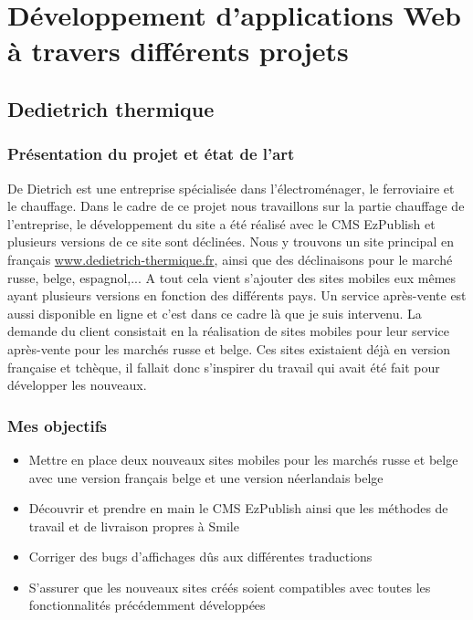 \documentclass[a4paper,11pt,twoside]{report}
\begin{document}
\chapter{Développement d'applications Web à travers différents projets}
  \section{Dedietrich thermique}
    \subsection*{Présentation du projet et état de l'art}
    De Dietrich est une entreprise spécialisée dans l'électroménager, le ferroviaire et le chauffage. Dans le cadre de ce projet nous travaillons sur la partie chauffage de l'entreprise, le développement du site a été réalisé avec le CMS EzPublish et plusieurs versions de ce site sont déclinées. Nous y trouvons un site principal en français \url{www.dedietrich-thermique.fr}, ainsi que des déclinaisons pour le marché russe, belge, espagnol,... A tout cela vient s'ajouter des sites mobiles eux mêmes ayant plusieurs versions en fonction des différents pays. Un service après-vente est aussi disponible en ligne et c'est dans ce cadre là que je suis intervenu. La demande du client consistait en la réalisation de sites mobiles pour leur service après-vente pour les marchés russe et belge. Ces sites existaient déjà en version française et tchèque, il fallait donc s'inspirer du travail qui avait été fait pour développer les nouveaux. 
    \subsection*{Mes objectifs}
      \begin{itemize}

	\item Mettre en place deux nouveaux sites mobiles pour les marchés russe et belge avec une version français belge et une version néerlandais belge
	\item Découvrir et prendre en main le CMS EzPublish ainsi que les méthodes de travail et de livraison propres à Smile
	\item Corriger des bugs d'affichages dûs aux différentes traductions
	\item S'assurer que les nouveaux sites créés soient compatibles avec toutes les fonctionnalités précédemment développées

      \end{itemize}
\end{document}
